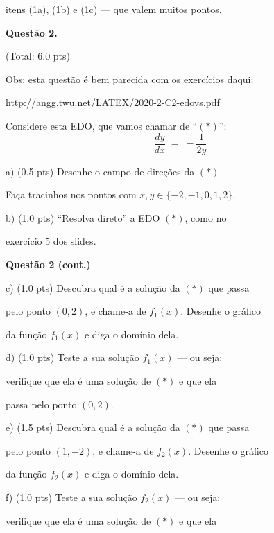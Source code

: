 \documentclass[oneside,12pt]{article}
\begin{document}
itens (1a), (1b) e (1c) --- que valem muitos pontos.




\newpage


{\bf Questão 2.}

\T(Total: 6.0 pts)

\msk

Obs: esta questão é bem parecida com os exercícios daqui:

{\footnotesize

\url{http://angg.twu.net/LATEX/2020-2-C2-edovs.pdf}

}

\bsk

Considere esta EDO, que vamos chamar de ``$(*)$'':
%
$$\frac{dy}{dx} \; = \; - \frac{1}{2y}$$

a) \B(0.5 pts) Desenhe o campo de direções da $(*)$.

Faça tracinhos nos pontos com $x,y∈\{-2,-1,0,1,2\}$.

\msk

b) \B(1.0 pts) ``Resolva direto'' a EDO $(*)$, como no

exercício 5 dos slides.

\newpage

{\bf Questão 2 (cont.)}

\ssk

c) \B(1.0 pts) Descubra qual é a solução da $(*)$ que passa

pelo ponto $(0,2)$, e chame-a de $f_1(x)$. Desenhe o gráfico

da função $f_1(x)$ e diga o domínio dela.

\msk

d) \B(1.0 pts) Teste a sua solução $f_1(x)$ --- ou seja:

verifique que ela é uma solução de $(*)$ e que ela

passa pelo ponto $(0,2)$.

\msk

e) \B(1.5 pts) Descubra qual é a solução da $(*)$ que passa

pelo ponto $(1,-2)$, e chame-a de $f_2(x)$. Desenhe o gráfico

da função $f_2(x)$ e diga o domínio dela.

\msk

f) \B(1.0 pts) Teste a sua solução $f_2(x)$ --- ou seja:

verifique que ela é uma solução de $(*)$ e que ela
\end{document}
